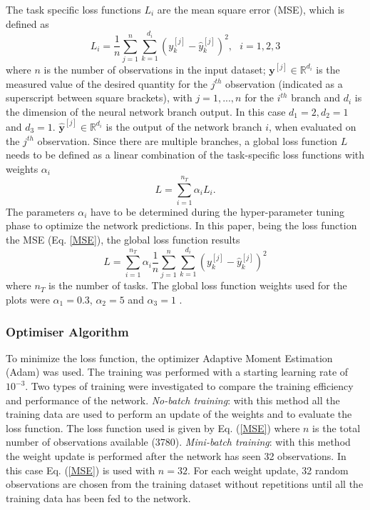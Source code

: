 \documentclass[9pt,twocolumn,twoside,pdftex]{optica}
\begin{document}
The task specific loss functions $L_i$ are the mean square error (MSE), which is defined as
\begin{equation}
L_i = \frac{1}{n} \sum_{j=1}^n \sum_{k=1}^{d_i} (y_k^{[j]}-\hat y_k^{[j]})^2, \ \ \ i=1,2,3
\label{MSE}
\end{equation}
where $n$ is the number of observations in the input dataset; ${\mathbold y}^{[j]} \in \mathbb{R}^{d_i}$ is the measured value of the desired quantity for the $j^{th}$ observation (indicated as a superscript between square brackets), with $j=1, ..., n$ for the $i^{th}$ branch and $d_i$ is the dimension of the neural network branch output. In this case $d_1=2, d_2=1$ and $d_3=1$. $ \hat {\mathbold y}^{[j]} \in \mathbb{R}^{d_i}$ is the output of the network branch $i$, when evaluated on the $j^{th}$ observation. Since there are multiple branches, a global loss function $L$ needs to be defined as a linear combination of the task-specific loss functions with weights $\alpha_i$ 
\begin{equation}
L = \sum_{i=1}^{n_T}\alpha_i L_i .
\label{globalcf}
\end{equation}
The parameters $\alpha_i$ have to be determined during the hyper-parameter tuning phase to optimize the network predictions.
In this paper, being the loss function the MSE (Eq. \ref{MSE}), the global loss function results
\begin{equation}
L = \sum_{i=1}^{n_T}\alpha_i \frac{1}{n} \sum_{j=1}^n \sum_{k=1}^{d_i} (y_k^{[j]}-\hat y_k^{[j]})^2
\end{equation}
where  $n_T$ is the number of tasks. The global loss function weights used for the plots were $\alpha_1 = 0.3$, $\alpha_2 = 5$ and $\alpha_3 = 1$ \cite{Michelucci2019_2}.
 

\subsubsection{Optimiser Algorithm}

To minimize the loss function, the optimizer Adaptive Moment Estimation (Adam) \cite{Kingma2014, Michelucci2017} was used. The training was performed with a starting learning rate of $10^{-3}$. Two types of training were investigated to compare the training efficiency and performance of the network. {\sl No-batch training}: with this method all the training data  are used to perform an update of the weights and to evaluate the loss function. The loss function used is given by Eq. (\ref{MSE}) where $n$ is the total number of observations available (3780). {\sl Mini-batch training}: with this method the weight update is performed after the network has seen 32 observations. In this case Eq. (\ref{MSE}) is used with $n=32$. For each weight update, 32 random observations are chosen from the training dataset without repetitions until all the training data has been fed to the network.  
\end{document}
